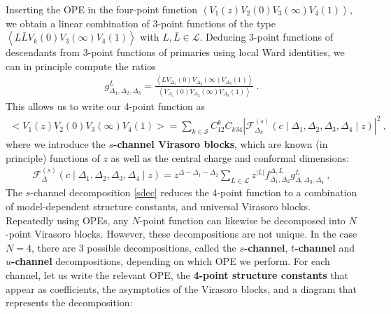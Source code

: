 \documentclass[12pt, a4paper]{article}
\theoremstyle{break}
\begin{document}
Inserting the OPE in the four-point function $\left<V_1(z)V_2(0)V_3(\infty)V_4(1)\right>$, we obtain a linear combination of 3-point functions of the type $\left<L\bar{L}V_k(0) V_3(\infty)V_4(1)\right>$ with $L,\bar L\in\mathcal{L}$. Deducing 3-point functions of descendants from 3-point functions of primaries using local Ward identities, we can in principle compute the ratios
\begin{align}
 g^L_{\Delta_1,\Delta_2,\Delta_3} = \frac{\left< LV_{\Delta_1}(0) V_{\Delta_2}(\infty)V_{\Delta_3}(1)\right>}{\left< V_{\Delta_1}(0) V_{\Delta_2}(\infty)V_{\Delta_3}(1)\right>}\ .
\end{align}
This allows us to write our 4-point function as 
\begin{align}
 \boxed{\Big<V_1(z)V_2(0)V_3(\infty)V_4(1)\Big> = \sum_{k\in\mathcal{S}} C_{12}^k C_{k34} \left|\mathcal{F}^{(s)}_{\Delta_k}\left(c\middle|\Delta_1,\Delta_2,\Delta_3,\Delta_4\middle|z\right)\right|^2}  \ ,
 \label{sdec}
\end{align}
where we introduce the \textbf{$s$-channel Virasoro blocks}, which are known (in principle) functions of $z$ as well as the central charge and conformal dimensions:
\begin{align}
 \mathcal{F}_{\Delta}^{(s)}\left(c\middle|\Delta_1,\Delta_2,\Delta_3,\Delta_4\middle|z\right) = z^{\Delta-\Delta_1-\Delta_2}\sum_{L\in\mathcal{L}} z^{|L|} f_{\Delta_1,\Delta_2}^{\Delta,L}g^L_{\Delta,\Delta_3,\Delta_4}\ ,
 \label{fsl}
\end{align}
The $s$-channel decomposition \eqref{sdec} reduces the 4-point function to a combination of model-dependent structure constants, and universal Virasoro blocks. Repeatedly using OPEs, any $N$-point function can likewise be decomposed into $N$-point Virasoro blocks. However, these decompositions are not unique. In the case $N=4$, there are 3 possible decompositions, called the \textbf{$s$-channel}, \textbf{$t$-channel} and \textbf{$u$-channel} decompositions, depending on which OPE we perform. For each channel, let us write the relevant OPE, the \textbf{4-point structure constants} that appear as coefficients, the asymptotics of the Virasoro blocks, and a diagram that represents the decomposition:
\end{document}
